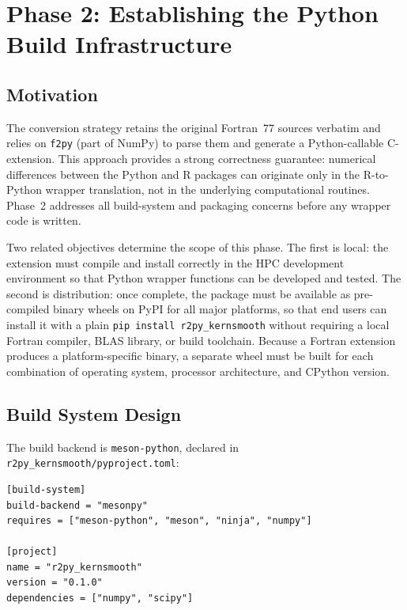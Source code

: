 \documentclass[12pt,a4paper]{article}
\begin{document}
\section{Phase 2: Establishing the Python Build Infrastructure}

\subsection{Motivation}

The conversion strategy retains the original Fortran~77 sources verbatim and relies on \texttt{f2py} (part of NumPy) to parse them and generate a Python-callable C-extension. This approach provides a strong correctness guarantee: numerical differences between the Python and R packages can originate only in the R-to-Python wrapper translation, not in the underlying computational routines. Phase~2 addresses all build-system and packaging concerns before any wrapper code is written.

Two related objectives determine the scope of this phase. The first is local: the extension must compile and install correctly in the HPC development environment so that Python wrapper functions can be developed and tested. The second is distribution: once complete, the package must be available as pre-compiled binary wheels on PyPI for all major platforms, so that end users can install it with a plain \texttt{pip install r2py\_kernsmooth} without requiring a local Fortran compiler, BLAS library, or build toolchain. Because a Fortran extension produces a platform-specific binary, a separate wheel must be built for each combination of operating system, processor architecture, and CPython version.

\subsection{Build System Design}

The build backend is \texttt{meson-python}, declared in \texttt{r2py\_kernsmooth/pyproject.toml}:

\begin{lstlisting}[style=shell]
[build-system]
build-backend = "mesonpy"
requires = ["meson-python", "meson", "ninja", "numpy"]

[project]
name = "r2py_kernsmooth"
version = "0.1.0"
dependencies = ["numpy", "scipy"]
\end{lstlisting}
\end{document}
